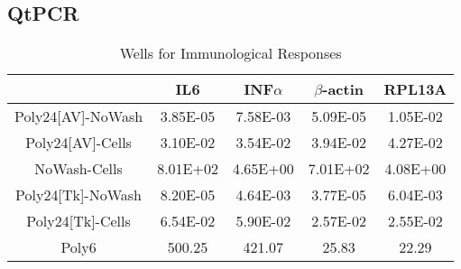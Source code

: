 \documentclass[journal, a4paper]{IEEEtran}
\begin{document}

  \subsection{QtPCR}

    \begin{table}[!hbt]
      \begin{center}
      \caption{Wells for Immunological Responses}
      \label{tab:simParameters}
      \begin{tabular}{|c|c|c|c|c|}
        \hline
        & IL6 & INF$\alpha$ & $\beta$-actin & RPL13A \\
        \hline
        Poly24[AV]-NoWash & 3.85E-05 & 7.58E-03 & 5.09E-05 & 1.05E-02 \\
        \hline
        Poly24[AV]-Cells & 3.10E-02 & 3.54E-02 & 3.94E-02 & 4.27E-02 \\
        \hline
        NoWash-Cells & 8.01E+02 & 4.65E+00 & 7.01E+02 & 4.08E+00 \\
        \hline
        Poly24[Tk]-NoWash & 8.20E-05 & 4.64E-03 & 3.77E-05 & 6.04E-03\\
        \hline
        Poly24[Tk]-Cells & 6.54E-02 & 5.90E-02 & 2.57E-02 & 2.55E-02\\
        \hline
        Poly6 & 500.25 & 421.07 & 25.83 & 22.29 \\
        \hline
      \end{tabular}
      \end{center}
    \end{table}
\end{document}
